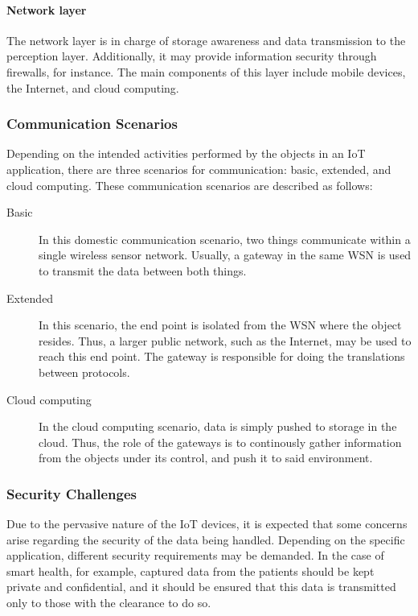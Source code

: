 \documentclass[12pt]{article}
\begin{document}
\paragraph{Network layer} The network layer is in charge of storage awareness and data transmission to the perception layer. Additionally, it may provide information security through firewalls, for instance. The main components of this layer include mobile devices, the Internet, and cloud computing.

\subsubsection{Communication Scenarios}

Depending on the intended activities performed by the objects in an IoT application, there are three scenarios for communication: basic, extended, and cloud computing. These communication scenarios are described as follows:

\begin{description}
\item[Basic] In this domestic communication scenario, two things communicate within a single wireless sensor network. Usually, a gateway in the same WSN is used to transmit the data between both things.
\item[Extended] In this scenario, the end point is isolated from the WSN where the object resides. Thus, a larger public network, such as the Internet, may be used to reach this end point. The gateway is responsible for doing the translations between protocols.
\item[Cloud computing] In the cloud computing scenario, data is simply pushed to storage in the cloud. Thus, the role of the gateways is to continously gather information from the objects under its control, and push it to said environment.
\end{description} 

\subsubsection{Security Challenges}

Due to the pervasive nature of the IoT devices, it is expected that some concerns arise regarding the security of the data being handled. Depending on the specific application, different security requirements may be demanded. In the case of smart health, for example, captured data from the patients should be kept private and confidential, and it should be ensured that this data is transmitted only to those with the clearance to do so.
\end{document}
